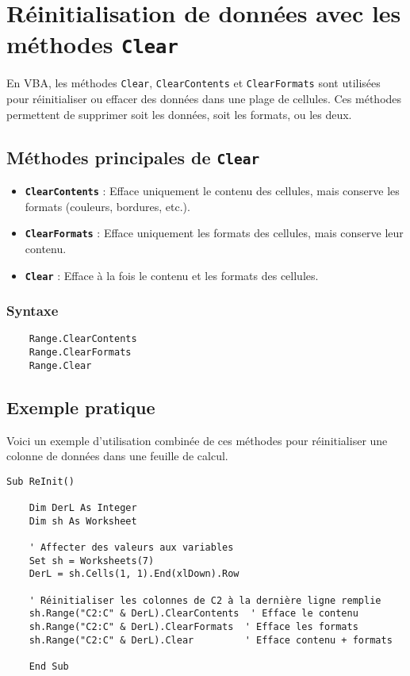 \documentclass[a4paper,12pt]{report}
\begin{document}
\chapter{Réinitialisation de données avec les méthodes \texttt{Clear}}

En VBA, les méthodes \texttt{Clear}, \texttt{ClearContents} et \texttt{ClearFormats} sont utilisées pour réinitialiser ou effacer des données dans une plage de cellules. Ces méthodes permettent de supprimer soit les données, soit les formats, ou les deux.

\section{Méthodes principales de \texttt{Clear}}

\begin{itemize}
	\item \textbf{\texttt{ClearContents}} : Efface uniquement le contenu des cellules, mais conserve les formats (couleurs, bordures, etc.).
	\item \textbf{\texttt{ClearFormats}} : Efface uniquement les formats des cellules, mais conserve leur contenu.
	\item \textbf{\texttt{Clear}} : Efface à la fois le contenu et les formats des cellules.
\end{itemize}

\subsection*{Syntaxe}
\begin{verbatim}
	Range.ClearContents
	Range.ClearFormats
	Range.Clear
\end{verbatim}

\section{Exemple pratique}

Voici un exemple d'utilisation combinée de ces méthodes pour réinitialiser une colonne de données dans une feuille de calcul.
\newpage
\begin{lstlisting}[language=vbscript, caption={Exemple de réinitialisation avec \texttt{Clear}}]
	Sub ReInit()
	
	Dim DerL As Integer
	Dim sh As Worksheet
	
	' Affecter des valeurs aux variables
	Set sh = Worksheets(7)
	DerL = sh.Cells(1, 1).End(xlDown).Row
	
	' Réinitialiser les colonnes de C2 à la dernière ligne remplie
	sh.Range("C2:C" & DerL).ClearContents  ' Efface le contenu
	sh.Range("C2:C" & DerL).ClearFormats  ' Efface les formats
	sh.Range("C2:C" & DerL).Clear         ' Efface contenu + formats
	
	End Sub
\end{lstlisting}
\end{document}
